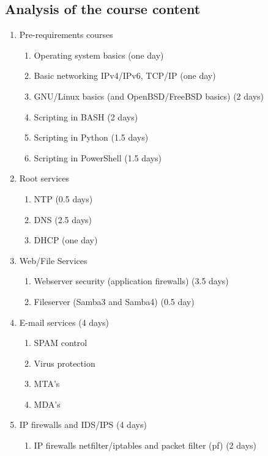 \subsection{Analysis of the course content}

\begin{enumerate}[label=Hands-on block \arabic*.,leftmargin=*]
  \item Pre-requirements courses
    \begin{enumerate}[label=LAB \arabic*.,leftmargin=*]
  	\item Operating system basics (one day)
  	\item Basic networking IPv4/IPv6, TCP/IP (one day)
  	\item GNU/Linux basics (and OpenBSD/FreeBSD basics) (2 days)
  	\item Scripting in BASH (2 days)
  	\item Scripting in Python (1.5 days)
  	\item Scripting in PowerShell (1.5 days)
  \end{enumerate}
  \item Root services
  \begin{enumerate}[label=LAB \arabic*.,leftmargin=*]
  	\item NTP (0.5 days)
  	\item DNS (2.5 days)
  	\item DHCP (one day)
  \end{enumerate}
  \item Web/File Services
    \begin{enumerate}[label=LAB \arabic*.,leftmargin=*]
  	\item Webserver security (application firewalls) (3.5 days)
  	\item Fileserver (Samba3 and Samba4) (0.5 day)
  \end{enumerate}
    \item E-mail services (4 days)
    \begin{enumerate}[label=LAB \arabic*.,leftmargin=*]
  		\item SPAM control
	  	\item Virus protection
  		\item MTA's 
	  	\item MDA's
    \end{enumerate}
    \item IP firewalls and IDS/IPS (4 days)
        \begin{enumerate}[label=LAB \arabic*.,leftmargin=*]
  		\item IP firewalls netfilter/iptables and packet filter (pf) (2 days)

\end{enumerate}
\end{enumerate}
